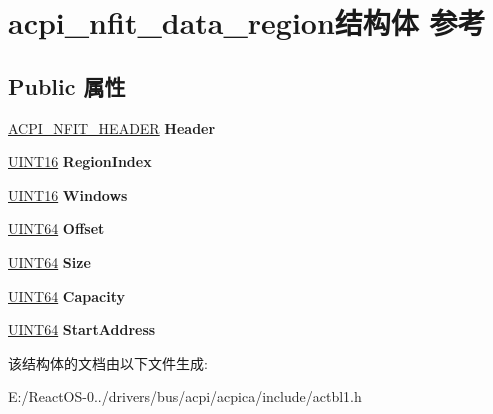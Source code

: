 \hypertarget{structacpi__nfit__data__region}{}\section{acpi\+\_\+nfit\+\_\+data\+\_\+region结构体 参考}
\label{structacpi__nfit__data__region}
\subsection*{Public 属性}
\begin{DoxyCompactItemize}
\item 
\mbox{\label{structacpi__nfit__data__region_a5fd00d1a3741d2d45d649e524b3274fe}} 
\hyperlink{structacpi__nfit__header}{A\+C\+P\+I\+\_\+\+N\+F\+I\+T\+\_\+\+H\+E\+A\+D\+ER} {\bfseries Header}
\item 
\mbox{\label{structacpi__nfit__data__region_ae46b09d5fda693988236103641061beb}} 
\hyperlink{_processor_bind_8h_a09f1a1fb2293e33483cc8d44aefb1eb1}{U\+I\+N\+T16} {\bfseries Region\+Index}
\item 
\mbox{\label{structacpi__nfit__data__region_a0dcd172d23cb2480cef3d1e5f6bcc188}} 
\hyperlink{_processor_bind_8h_a09f1a1fb2293e33483cc8d44aefb1eb1}{U\+I\+N\+T16} {\bfseries Windows}
\item 
\mbox{\label{structacpi__nfit__data__region_a7219f8c9bb8759bac19d3e80040c8e3c}} 
\hyperlink{_processor_bind_8h_a57be03562867144161c1bfee95ca8f7c}{U\+I\+N\+T64} {\bfseries Offset}
\item 
\mbox{\label{structacpi__nfit__data__region_a9238c7fb941006daeb60f790901c3d05}} 
\hyperlink{_processor_bind_8h_a57be03562867144161c1bfee95ca8f7c}{U\+I\+N\+T64} {\bfseries Size}
\item 
\mbox{\label{structacpi__nfit__data__region_a5e142fe8451ab47740da609ab5727bf5}} 
\hyperlink{_processor_bind_8h_a57be03562867144161c1bfee95ca8f7c}{U\+I\+N\+T64} {\bfseries Capacity}
\item 
\mbox{\label{structacpi__nfit__data__region_a94ac6440a7a1100b58799086bb31500b}} 
\hyperlink{_processor_bind_8h_a57be03562867144161c1bfee95ca8f7c}{U\+I\+N\+T64} {\bfseries Start\+Address}
\end{DoxyCompactItemize}


该结构体的文档由以下文件生成\+:\begin{DoxyCompactItemize}
\item 
E\+:/\+React\+O\+S-\/0../drivers/bus/acpi/acpica/include/actbl1.\+h\end{DoxyCompactItemize}
